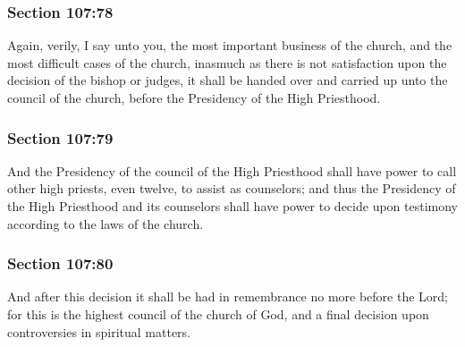 	\subsubsection{Section 107:78} %
		\label{DC107-78}

		Again, verily, I say unto you, the most important business of the church, and the most difficult cases of the church, inasmuch as there is not satisfaction upon the decision of the bishop or judges, it shall be handed over and carried up unto the council of the church, before the Presidency of the High Priesthood.


	\subsubsection{Section 107:79} %
		\label{DC107-79}

		And the Presidency of the council of the High Priesthood shall have power to call other high priests, even twelve, to assist as counselors; and thus the Presidency of the High Priesthood and its counselors shall have power to decide upon testimony according to the laws of the church.


	\subsubsection{Section 107:80} %
		\label{DC107-80}

		And after this decision it shall be had in remembrance no more before the Lord; for this is the highest council of the church of God, and a final decision upon controversies in spiritual matters.

